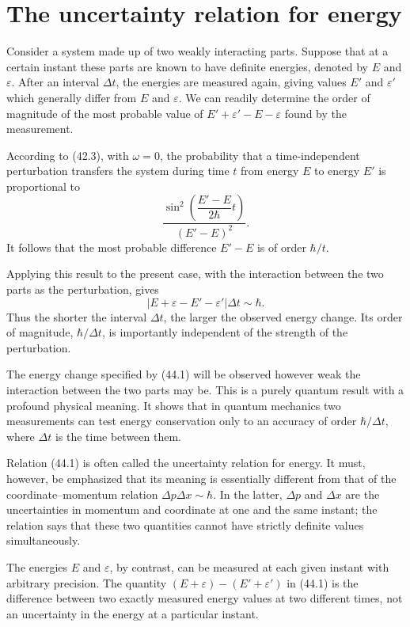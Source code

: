 \section{The uncertainty relation for energy}

Consider a system made up of two weakly interacting parts. Suppose that at a
certain instant these parts are known to have definite energies, denoted by
$E$ and $\varepsilon$. After an interval $\Delta t$, the energies are measured
again, giving values $E'$ and $\varepsilon'$ which generally differ from $E$
and $\varepsilon$. We can readily determine the order of magnitude of the
most probable value of $E'+\varepsilon'-E-\varepsilon$ found by the
measurement.

According to (42.3), with $\omega=0$, the probability that a time-independent
perturbation transfers the system during time $t$ from energy $E$ to energy
$E'$ is proportional to
\[
  \frac{\sin^2\left(\dfrac{E'-E}{2\hbar}t\right)}{(E'-E)^2}.
\]
It follows that the most probable difference $E'-E$ is of order $\hbar/t$.

Applying this result to the present case, with the interaction between the
two parts as the perturbation, gives
\begin{equation}
  |E+\varepsilon-E'-\varepsilon'|\Delta t\sim\hbar.
  \tag{44.1}
\end{equation}
Thus the shorter the interval $\Delta t$, the larger the observed energy
change. Its order of magnitude, $\hbar/\Delta t$, is importantly independent
of the strength of the perturbation.

The energy change specified by (44.1) will be observed however weak the
interaction between the two parts may be. This is a purely quantum result
with a profound physical meaning. It shows that in quantum mechanics two
measurements can test energy conservation only to an accuracy of order
$\hbar/\Delta t$, where $\Delta t$ is the time between them.

Relation (44.1) is often called the uncertainty relation for energy. It must,
however, be emphasized that its meaning is essentially different from that
of the coordinate--momentum relation $\Delta p\Delta x\sim\hbar$. In the
latter, $\Delta p$ and $\Delta x$ are the uncertainties in momentum and
coordinate at one and the same instant; the relation says that these two
quantities cannot have strictly definite values simultaneously.

The energies $E$ and $\varepsilon$, by contrast, can be measured at each
given instant with arbitrary precision. The quantity
$(E+\varepsilon)-(E'+\varepsilon')$ in (44.1) is the difference between two
exactly measured energy values at two different times, not an uncertainty in
the energy at a particular instant.

